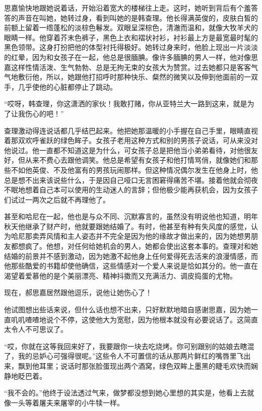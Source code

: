 \par 思嘉愉快地跟她说着话，开始沿着宽大的楼梯往上走。这时，她听到背后有个羞答答的声音在叫她，她转过身，看到叫她的是韩查理。他长得满英俊的，皮肤白皙的前额上留着一绺蓬松的淡棕色鬈发。双眼呈深棕色，清澈而温和，就像大牧羊犬的眼睛一样。他穿着芥末色裤子，黑色上衣和褶状衬衫，衬衫最上方是最宽最时髦的黑色领带。这身打扮把他的体型衬托得极好。她转过身来时，他脸上现出一片淡淡的红晕，因为和女孩子在一起，他总是很腼腆。像许多腼腆的男人一样，他对像思嘉这样性情活泼、生气勃勃、总是无拘无束的女孩大为赞赏。过去她都只是客客气气地敷衍他，所以，她跟他打招呼时那种快乐、粲然的微笑以及伸到他面前的一双手，几乎使他的心脏都停止了跳动。
\par “哎呀，韩查理，你这潇洒的家伙！我敢打赌，你从亚特兰大一路到这来，就是为了让我伤心的吧！”
\par 查理激动得连说话都几乎结巴起来。他把她那温暖的小手握在自己手里，眼睛直视着那双欢呼雀跃的绿色眸子。女孩子老用这种方式和别的男孩子说话，可从来没对他说过。他一直都不知道这是为什么，可女孩子总是把他当小弟弟看待，对他很友好，但从来不费心去跟他调笑。他总是希望有女孩子和他打情骂俏，就像她们和那些不如他英俊、不及他富有的男孩玩闹那样。但这种情况偶尔发生在他身上时，他总是想不出来该说些什么，于是因自己哑口无言困窘得痛苦不堪。接着他就会彻夜不眠地想着自己本可以使用的生动迷人的言辞；但他极少能再获机会，因为女孩子们试过一两次之后就不再理他了。
\par 甚至和哈尼在一起，他也是与众不同、沉默寡言的，虽然没有明说他也知道，明年秋天他继承了财产时，他就要跟她结婚了。有时，他甚至有种有失风度的感觉，认为哈尼那卖弄风情和主人姿态并不完全是因为他的缘故才做出来的，因为她想男朋友都想疯了。他想，对任何给她机会的男人，她都会使出这套本事的。查理对和她结婚的前景并不感到激动，因为她激不起他身上任何爱得死去活来的浪漫情感，而他那些酷爱的书籍却使他确信，这些情感对一个爱人来说是恰如其分的。他一直在渴望着爱慕他的是个美丽漂亮、精神抖擞而又充满活力、调皮捣蛋的尤物。
\par 现在，郝思嘉居然跟他逗乐，说他让她伤心了！
\par 他试图想出些话来说，但什么话也想不出来，只好默默地暗自感谢思嘉，因为她一直叽叽喳喳地说个不停，这使他大为宽慰，因为他根本就没有必要说话了。这简直太令人不可思议了。
\par “哎，你就在这等我回来好了，我要跟你一块去吃烧烤。你可别跟别的姑娘去瞎混了，我的忌妒心可强得很呢。”这些令人不可置信的话从那两片鲜红的嘴唇里飞出来，飘到他耳里；说话时那张脸蛋现出两个酒窝，绿色双眸上墨黑的睫毛欢快而娴静地眨巴着。
\par “我不会的。”他终于设法透过气来，做梦都没想到她心里想的其实是，他看上去就像一头等着屠夫来屠宰的小牛犊一样。
